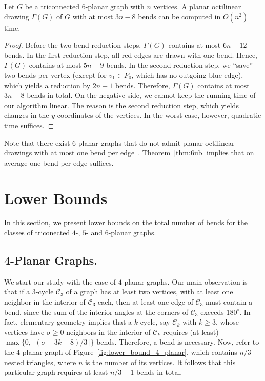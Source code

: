 \documentclass[a4paper,twoside,11pt]{article}
\begin{document}
\begin{theorem}
Let $G$ be a triconnected $6$-planar graph with $n$ vertices. A
planar octilinear drawing $\Gamma(G)$ of $G$ with at most $3n-8$
bends can be computed in $O(n^2)$ time.
\label{thm:6ub} 
\end{theorem}
\begin{proof}
Before the two bend-reduction steps, $\Gamma(G)$ contains at most
$6n-12$ bends. In the first reduction step, all red edges are drawn
with one bend. Hence, $\Gamma(G)$ contains at most $5n-9$ bends. In
the second reduction step, we ``save'' two bends per vertex (except
for $v_1 \in P_0$, which has no outgoing blue edge), which yields a
reduction by $2n-1$ bends. Therefore, $\Gamma(G)$ contains at most
$3n-8$ bends in total. On the negative side, we cannot keep the
running time of our algorithm linear. The reason is the second
reduction step, which yields changes in the $y$-coordinates of the
vertices. In the worst case, however, quadratic time suffices.
\end{proof}

Note that there exist $6$-planar graphs that do not admit planar
octilinear drawings with at most one bend per edge~\cite{BGKK14}.
Theorem~\ref{thm:6ub} implies that on average one bend per edge
suffices.

\section{Lower Bounds}
\label{sec:lowerbounds}


In this section, we present lower bounds on the total number of
bends for the classes of triconected $4$-, $5$- and $6$-planar
graphs.

\subsection{4-Planar Graphs.} 
\label{sec:4planarl}


We start our study with the case of $4$-planar graphs.
Our main observation is that if a $3$-cycle $\mathcal{C}_3$ of a
graph has at least two vertices, with at least one neighbor in the
interior of $\mathcal{C}_3$ each, then at least one edge of
$\mathcal{C}_3$ must contain a bend, since the sum of the interior
angles at the corners of $\mathcal{C}_3$ exceeds $180^\circ$. In
fact, elementary geometry implies that a $k$-cycle, say
$\mathcal{C}_k$ with $k \geq 3$, whose vertices have $\sigma \geq 0$
neighbors in the interior of $\mathcal{C}_k$ requires (at least)
$\max \{0, \lceil (\sigma -3k + 8)/3 \rceil \}$ bends.
Therefore, a bend is necessary. Now, refer to the $4$-planar graph
of Figure~\ref{fig:lower_bound_4_planar}, which contains $n/3$ nested
triangles, where $n$ is the number of its vertices. It follows that
this particular graph requires at least $n/3-1$ bends in total.
\end{document}
